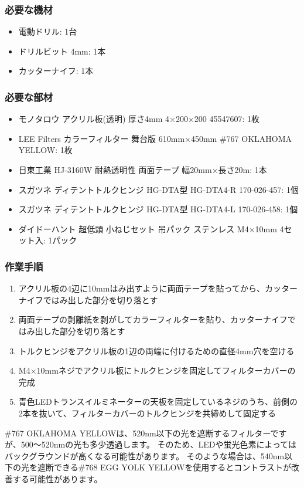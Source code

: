 \documentclass[titlepage,10pt,a4paper,uplatex]{jsbook}
\begin{document}
\subsubsection{必要な機材}
\begin{itemize}
\item 電動ドリル: 1台
\item ドリルビット 4mm: 1本
\item カッターナイフ: 1本
\end{itemize}

\subsubsection{必要な部材}
\begin{itemize}
\item モノタロウ アクリル板(透明) 厚さ4mm 4×200×200 45547607: 1枚
\item LEE Filters カラーフィルター 舞台版 610mm×450mm \#767 OKLAHOMA YELLOW: 1枚
\item 日東工業 HJ-3160W 耐熱透明性 両面テープ 幅20mm×長さ20m: 1本
\item スガツネ ディテントトルクヒンジ HG-DTA型 HG-DTA4-R 170-026-457: 1個
\item スガツネ ディテントトルクヒンジ HG-DTA型 HG-DTA4-L 170-026-458: 1個
\item ダイドーハント 超低頭 小ねじセット 吊パック ステンレス M4×10mm 4セット入: 1パック
\end{itemize}

\subsubsection{作業手順}
\begin{enumerate}
\item アクリル板の4辺に10mmはみ出すように両面テープを貼ってから、カッターナイフではみ出した部分を切り落とす
\item 両面テープの剥離紙を剥がしてカラーフィルターを貼り、カッターナイフではみ出した部分を切り落とす
\item トルクヒンジをアクリル板の1辺の両端に付けるための直径4mm穴を空ける
\item M4×10mmネジでアクリル板にトルクヒンジを固定してフィルターカバーの完成
\item 青色LEDトランスイルミネーターの天板を固定しているネジのうち、前側の2本を抜いて、フィルターカバーのトルクヒンジを共締めして固定する
\end{enumerate}

\#767 OKLAHOMA YELLOWは、520nm以下の光を遮断するフィルターですが、500～520nmの光も多少透過します。
そのため、LEDや蛍光色素によってはバックグラウンドが高くなる可能性があります。
そのような場合は、540nm以下の光を遮断できる\#768 EGG YOLK YELLOWを使用するとコントラストが改善する可能性があります。
\end{document}
